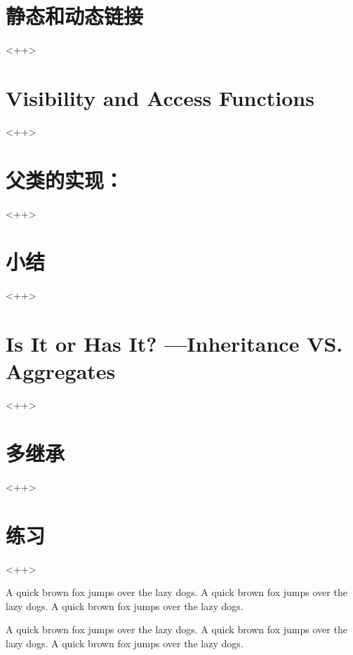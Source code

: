 \section{静态和动态链接}<++>

\section{Visibility and Access Functions}<++>

\section{父类的实现：}<++>

\section{小结}<++>

\section{Is It or Has It? ---Inheritance VS. Aggregates}<++>

\section{多继承}<++>

\section{练习}<++>

A quick brown fox jumps over the lazy dogs.
A quick brown fox jumps over the lazy dogs.
A quick brown fox jumps over the lazy dogs.

A quick brown fox jumps over the lazy dogs.
A quick brown fox jumps over the lazy dogs.
A quick brown fox jumps over the lazy dogs.


